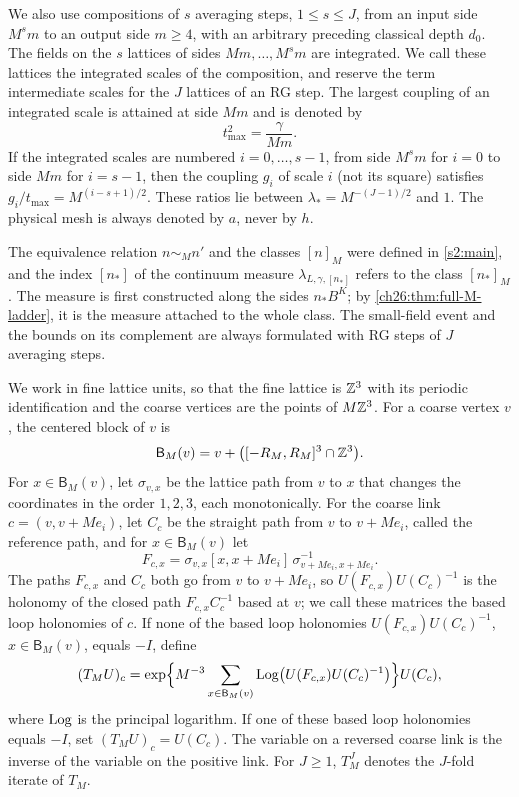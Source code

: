 We also use compositions of $s$ averaging steps, $1\le s\le J$, from an input side $M^sm$ to an output side $m\ge4$, with an arbitrary preceding classical depth $d_0$. The fields on the $s$ lattices of sides $Mm,\dots,M^sm$ are integrated. We call these lattices the integrated scales of the composition, and reserve the term intermediate scales for the $J$ lattices of an RG step. The largest coupling of an integrated scale is attained at side $Mm$ and is denoted by
\[
 t_{\max}^2=\frac{\gamma}{Mm}.
\]
If the integrated scales are numbered $i=0,\dots,s-1$, from side $M^sm$ for $i=0$ to side $Mm$ for $i=s-1$, then the coupling $g_i$ of scale $i$ (not its square) satisfies $g_i/t_{\max}=M^{(i-s+1)/2}$. These ratios lie between $\lambda_*=M^{-(J-1)/2}$ and $1$. The physical mesh is always denoted by $a$, never by $h$.

The equivalence relation $n\sim_Mn'$ and the classes $[n]_M$ were defined in \cref{s2:main}, and the index $[n_*]$ of the continuum measure $\lambda_{L,\gamma,[n_*]}$ refers to the class $[n_*]_M$. The measure is first constructed along the sides $n_*B^K$; by \cref{ch26:thm:full-M-ladder}, it is the measure attached to the whole class. The small-field event and the bounds on its complement are always formulated with RG steps of $J$ averaging steps.

\begin{definition}\label{ch01:def:block-map}
We work in fine lattice units, so that the fine lattice is $\mathbb Z^3$ with its periodic identification and the coarse vertices are the points of $M\mathbb Z^3$. For a coarse vertex $v$, the centered block of $v$ is
\[
 \mathsf B_M(v)=v+\bigl([-R_M,R_M]^3\cap\mathbb Z^3\bigr).
\]
For $x\in\mathsf B_M(v)$, let $\sigma_{v,x}$ be the lattice path from $v$ to $x$ that changes the coordinates in the order $1,2,3$, each monotonically. For the coarse link $c=(v,v+Me_i)$, let $C_c$ be the straight path from $v$ to $v+Me_i$, called the reference path, and for $x\in\mathsf B_M(v)$ let
\[
 F_{c,x}=\sigma_{v,x}[x,x+Me_i]\,\sigma_{v+Me_i,x+Me_i}^{-1}.
\]
The paths $F_{c,x}$ and $C_c$ both go from $v$ to $v+Me_i$, so $U(F_{c,x})U(C_c)^{-1}$ is the holonomy of the closed path $F_{c,x}C_c^{-1}$ based at $v$; we call these matrices the based loop holonomies of $c$. If none of the based loop holonomies $U(F_{c,x})U(C_c)^{-1}$, $x\in\mathsf B_M(v)$, equals $-I$, define
\begin{equation}\label{ch01:eq:ordinary-map}
 (T_MU)_c=
 \exp\Bigl\{M^{-3}\sum_{x\in\mathsf B_M(v)}\operatorname{Log}\bigl(U(F_{c,x})U(C_c)^{-1}\bigr)\Bigr\}U(C_c),
\end{equation}
where $\operatorname{Log}$ is the principal logarithm. If one of these based loop holonomies equals $-I$, set $(T_MU)_c=U(C_c)$. The variable on a reversed coarse link is the inverse of the variable on the positive link. For $J\ge1$, $T_M^J$ denotes the $J$-fold iterate of $T_M$.
\end{definition}

